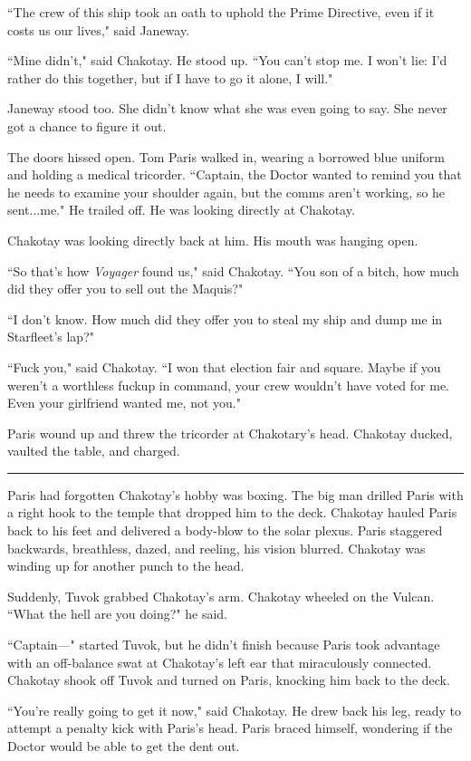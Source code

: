 \documentclass[twoside,letterpaper,12pt]{memoir}
\begin{document}
``The crew of this ship took an oath to uphold the Prime Directive, even if it costs us our lives," said Janeway.

``Mine didn't," said Chakotay. He stood up. ``You can't stop me. I won't lie: I'd rather do this together, but if I have to go it alone, I will."

Janeway stood too. She didn't know what she was even going to say. She never got a chance to figure it out.

The doors hissed open. Tom Paris walked in, wearing a borrowed blue uniform and holding a medical tricorder. ``Captain, the Doctor wanted to remind you that he needs to examine your shoulder again, but the comms aren't working, so he sent...me." He trailed off. He was looking directly at Chakotay.

Chakotay was looking directly back at him. His mouth was hanging open.

``So that's how \textit{Voyager} found us," said Chakotay. ``You son of a bitch, how much did they offer you to sell out the Maquis?"

``I don't know. How much did they offer you to steal my ship and dump me in Starfleet's lap?"

``Fuck you," said Chakotay. ``I won that election fair and square. Maybe if you weren't a worthless fuckup in command, your crew wouldn't have voted for me. Even your girlfriend wanted me, not you."

Paris wound up and threw the tricorder at Chakotary's head. Chakotay ducked, vaulted the table, and charged.

\fancybreak{\rule{3cm}{0.4 pt}}
Paris had forgotten Chakotay's hobby was boxing. The big man drilled Paris with a right hook to the temple that dropped him to the deck. Chakotay hauled Paris back to his feet and delivered a body-blow to the solar plexus. Paris staggered backwards, breathless, dazed, and reeling, his vision blurred. Chakotay was winding up for another punch to the head.

Suddenly, Tuvok grabbed Chakotay's arm. Chakotay wheeled on the Vulcan. ``What the hell are you doing?" he said.

``Captain---" started Tuvok, but he didn't finish because Paris took advantage with an off-balance swat at Chakotay's left ear that miraculously connected. Chakotay shook off Tuvok and turned on Paris, knocking him back to the deck.

``You're really going to get it now," said Chakotay. He drew back his leg, ready to attempt a penalty kick with Paris's head. Paris braced himself, wondering if the Doctor would be able to get the dent out.
\end{document}
